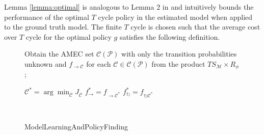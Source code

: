 \documentclass[journal]{IEEEtran}
\makeatletter
\newcommand{\removelatexerror}{\let\@latex@error\@gobble}
\makeatother
\begin{document}
Lemma \ref{lemma:optimal} is analogous to Lemma 2 in \cite{Fu-RSS-14} and intuitively bounds the performance of the optimal $T$ cycle policy in the estimated model when applied to the ground truth model. The finite $T$ cycle is chosen such that the average cost over $T$ cycle for the optimal policy $g$ satisfies the following definition.
\begin{figure}[!t]
	\removelatexerror
	\begin{algorithm}[H]
		\BlankLine
		\nl Obtain the AMEC set $\mathcal{C}(\mathcal{P})$ with only the transition probabilities unknown and $f_{\rightarrow\mathcal{C}}$ for each $\mathcal{C}\in\mathcal{C}(\mathcal{P})$ from the product $TS_{\mathcal{M}}\times R_\phi$;\
		
		
		
		\nl	{}
		
		
		\nl $\mathcal{C}^*=\arg\min_{\mathcal{\bar{C}}}{J_{\bar{\mathcal{C}}}}$\;
		\nl $f^*_{\rightarrow} = f_{\rightarrow{\mathcal{C}^*}}$\;
		\nl $f^*_{\circlearrowright} = f_{\circlearrowright{\mathcal{C}^*}}$\;
		\nl {}\;
		
		~\caption{ModelLearningAndPolicyFinding}\label{alg:learning}			
	\end{algorithm}
\end{figure}
\end{document}
